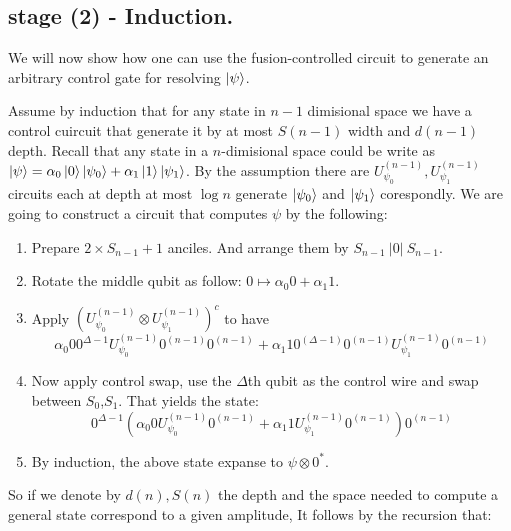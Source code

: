 \documentclass[manuscript,screen,review]{acmart}
\begin{document}

\subsection{stage (2) - Induction.}

We will now show how one can use the fusion-controlled circuit to generate an arbitrary control gate for resolving $\ket{\psi}$. 

Assume by induction that for any state in $n-1$ dimisional space we have a control cuircuit that generate it by at most $S(n-1)$ width and $d(n-1)$ depth. Recall that any state in a $n$-dimisional space could be write as $\ket{\psi} = \alpha_{0} \ket{0}\ket{ \psi_{0}} + \alpha_{1} \ket{1}\ket{ \psi_{1}} $. By the assumption there are $U_{\psi_{0}}^{(n-1)},U_{\psi_{1}}^{(n-1)}$ circuits each at depth at most $\log n$ generate $\ket{\psi_{0}}$ and $\ket{\psi_{1}}$ corespondly. We are going to construct a circuit that computes $\psi$ by the following: 
\begin{enumerate}
  \item Prepare $2 \times S_{n-1} + 1$ anciles. And arrange them by $S_{n-1} \ |0| \ S_{n-1}$. 
  \item Rotate the middle qubit as follow: $ 0 \mapsto \alpha_{0} 0 + \alpha_{1} 1 $.   
  \item Apply $\left(U_{\psi_{0}}^{(n-1)} \otimes U_{\psi_{1}}^{(n-1)}\right)^{c} $ to have 
    \begin{equation*}
      \alpha_{0} 0 0^{\Delta -1} U_{\psi_{0}}^{(n-1)} 0^{(n-1)} 0^{(n-1)} + \alpha_{1} 1 0^{(\Delta - 1)}0^{(n-1)}U_{\psi_{1}}^{(n-1)}0^{(n-1)}
    \end{equation*}
  \item Now apply control swap, use the $\Delta$th qubit as the control wire and swap between $S_{0}$,$S_{1}$. That yields the state: 
    \begin{equation*} 0^{\Delta -1} \left(\alpha_{0} 0 U_{\psi_{0}}^{(n-1)} 0^{(n-1)} + \alpha_{1} 1 U_{\psi_{1}}^{(n-1)}0^{(n-1)} \right)0^{(n-1)} 
    \end{equation*}
\item By induction, the above state expanse to $\psi \otimes 0^{*}$.
\end{enumerate}
So if we denote by $d(n), S(n)$ the depth and the space needed to compute a general state correspond to a given amplitude, It follows by the recursion that: 
\end{document}
